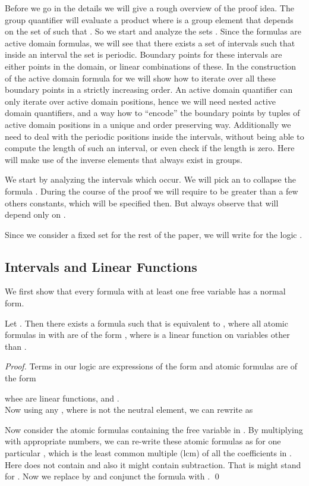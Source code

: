 \documentclass[envcountsame]{llncs}
\begin{document}
Before we go in the details we will give a rough overview of the proof idea.
The group quantifier will evaluate a product  where  is a group element that depends on the set of  such that . So we start and analyze the sets . Since the formulas  are active domain formulas, we will see that there exists a set of intervals such that inside an interval the set  is periodic. Boundary points for these intervals are either points in the domain, or linear combinations of these. 
In the construction of the active domain formula for  we will show how to iterate over all these boundary points in a strictly increasing order. An active domain quantifier can only iterate over active domain positions, hence we will need nested active domain quantifiers, and a way how to ``encode'' the boundary points by tuples of active domain positions in a unique and order preserving way. Additionally we need to deal with the periodic positions inside the intervals, without being able to compute the length of such an interval, or even check if the length is zero. Here will make use of the inverse elements that always exist in groups.
 
We start by analyzing the intervals which occur.
We will pick an  to collapse the formula . During the course of the proof we will require 
 to be greater than a few others constants, which will be specified then. But always observe that  will depend only on .


Since we consider a fixed set  for the rest of the paper, we will write  for the logic .

\subsection{Intervals and Linear Functions} \label{linFunc}
We first show that every formula  with at least one free variable has a normal form.
\begin{lemma}
 \label{lem_normalform}
Let . Then there exists a formula  such that  is equivalent to , where all 
atomic formulas in  with  are of the form , where  is a linear function on variables other than .
 \end{lemma}

\begin{proof}
Terms in our logic are expressions of the form  and atomic formulas are of the form

whee  are linear functions,  and . \\
Now using any , where  is not the neutral element, we can rewrite  as

Now consider the atomic formulas containing the free variable  in . 
By multiplying with appropriate numbers, we can re-write these atomic formulas as  
for one particular , which is the least common multiple (lcm) of all the coefficients in . Here  does not contain  and also it might contain subtraction. That is  might stand for . Now we replace  by  and 
conjunct the formula with . 
\qed \end{proof}
\end{document}
